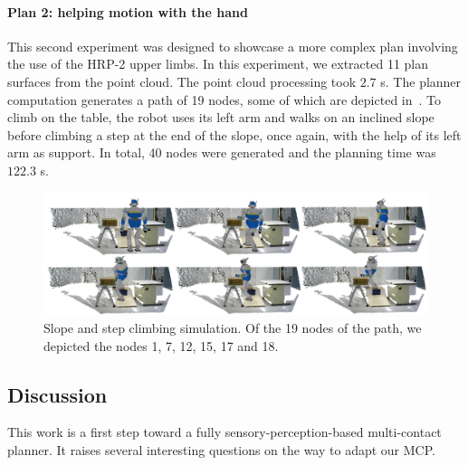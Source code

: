 \paragraph{Plan 2: helping motion with the hand}
This second experiment was designed to showcase a more complex plan involving the use of the HRP-2 upper limbs.
In this experiment, we extracted 11 plan surfaces from the point cloud.
The point cloud processing took $2.7$ s.
The planner computation generates a path of 19 nodes, some of which are depicted in~.
To climb on the table, the robot uses its left arm and walks on an inclined slope before climbing a step at the end of the slope, once again, with the help of its left arm as support.
In total, 40 nodes were generated and the planning time was $122.3$ s.

\begin{figure}
  \centering
  \includegraphics[width=\linewidth]{hrp2slope.png}
  \caption{Slope and step climbing simulation. Of the 19 nodes of the path, we depicted the nodes 1, 7, 12, 15, 17 and 18.}
\label{fig:crapahut-simulation}
\end{figure}

\subsection{Discussion}
\label{sub:discussion_planning_pcl}

This work is a first step toward a fully sensory-perception-based multi-contact planner.
It raises several interesting questions on the way to adapt our MCP\@.

